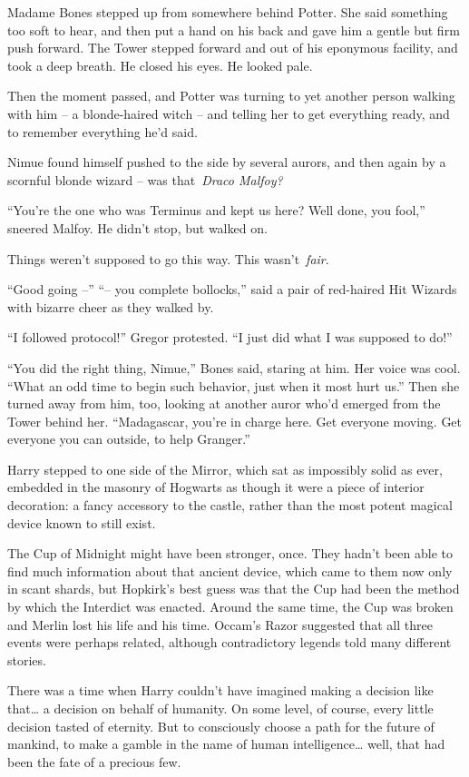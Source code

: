 Madame Bones stepped up from somewhere behind Potter. She said something
too soft to hear, and then put a hand on his back and gave him a gentle
but firm push forward. The Tower stepped forward and out of his
eponymous facility, and took a deep breath. He closed his eyes. He
looked pale.

Then the moment passed, and Potter was turning to yet another person
walking with him -- a blonde-haired witch -- and telling her to get
everything ready, and to remember everything he'd said.

Nimue found himself pushed to the side by several aurors, and then again
by a scornful blonde wizard -- was that~\emph{Draco Malfoy?}

``You're the one who was Terminus and kept us here? Well done, you
fool,'' sneered Malfoy. He didn't stop, but walked on.

Things weren't supposed to go this way. This wasn't~\emph{fair}.

``Good going --'' ``-- you complete bollocks,'' said a pair of
red-haired Hit Wizards with bizarre cheer as they walked by.

``I followed protocol!'' Gregor protested. ``I just did what I was
supposed to do!''

``You did the right thing, Nimue,'' Bones said, staring at him. Her
voice was cool. ``What an odd time to begin such behavior, just when it
most hurt us.'' Then she turned away from him, too, looking at another
auror who'd emerged from the Tower behind her. ``Madagascar, you're in
charge here. Get everyone moving. Get everyone you can outside, to help
Granger.''

\mybreak

Harry stepped to one side of the Mirror, which sat as impossibly solid
as ever, embedded in the masonry of Hogwarts as though it were a piece
of interior decoration: a fancy accessory to the castle, rather than the
most potent magical device known to still exist.

The Cup of Midnight might have been stronger, once. They hadn't been
able to find much information about that ancient device, which came to
them now only in scant shards, but Hopkirk's best guess was that the Cup
had been the method by which the Interdict was enacted. Around the same
time, the Cup was broken and Merlin lost his life and his time. Occam's
Razor suggested that all three events were perhaps related, although
contradictory legends told many different stories.

There was a time when Harry couldn't have imagined making a decision
like that\ldots{} a decision on behalf of humanity. On some level, of
course, every little decision tasted of eternity. But to consciously
choose a path for the future of mankind, to make a gamble in the name of
human intelligence\ldots{} well, that had been the fate of a precious
few.

